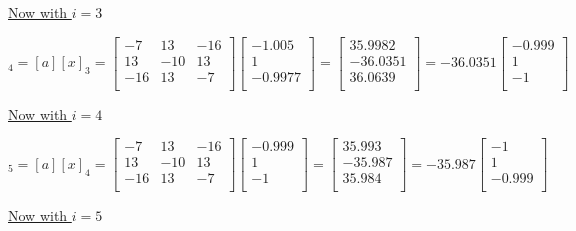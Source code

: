 \documentclass{article}
\begin{document}
\underline{Now with $i = 3$}


\begin{equation*}
[x]_4 = [a][x]_3 =
\begin{bmatrix}
-7 & 13 & -16 \\
13 & -10 & 13 \\
-16 & 13 & -7 \\
\end{bmatrix}
\begin{bmatrix}
-1.005\\
1\\
-0.9977\\
\end{bmatrix}
=
\begin{bmatrix}
35.9982\\
-36.0351\\
36.0639\\
\end{bmatrix}
=-36.0351
\begin{bmatrix}
-0.999\\
1\\
-1\\
\end{bmatrix}
\end{equation*}

\underline{Now with $i = 4$}


\begin{equation*}
[x]_5 = [a][x]_4 =
\begin{bmatrix}
-7 & 13 & -16 \\
13 & -10 & 13 \\
-16 & 13 & -7 \\
\end{bmatrix}
\begin{bmatrix}
-0.999\\
1\\
-1\\
\end{bmatrix}
=
\begin{bmatrix}
35.993\\
-35.987\\
35.984\\
\end{bmatrix}
=-35.987
\begin{bmatrix}
-1\\
1\\
-0.999\\
\end{bmatrix}
\end{equation*}

\underline{Now with $i = 5$}
\end{document}
